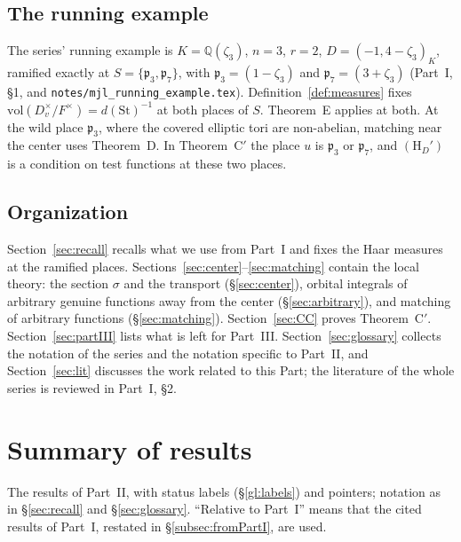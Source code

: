 \documentclass[12pt]{article}
\newcommand{\St}{\mathrm{St}}
\newcommand{\sg}{\sigma}
\theoremstyle{plain}
\theoremstyle{definition}
\begin{document}
\subsection*{The running example}
The series' running example is $K=\mathbb{Q}(\zeta_3)$, $n=3$, $r=2$, $D=(-1,4-\zeta_3)_K$, ramified exactly at $S=\{\mathfrak p_3,\mathfrak p_7\}$, with $\mathfrak p_3=(1-\zeta_3)$ and $\mathfrak p_7=(3+\zeta_3)$ (Part~I, \S1, and \texttt{notes/mjl\_running\_example.tex}). Definition~\ref{def:measures} fixes $\mathrm{vol}(D_v^\times/F^\times)=d(\St)^{-1}$ at both places of $S$. Theorem~E applies at both. At the wild place $\mathfrak p_3$, where the covered elliptic tori are non-abelian, matching near the center uses Theorem~D. In Theorem~C$'$ the place $u$ is $\mathfrak p_3$ or $\mathfrak p_7$, and $(\mathrm H_D')$ is a condition on test functions at these two places.

\subsection{Organization}
Section~\ref{sec:recall} recalls what we use from Part~I and fixes the Haar measures at the ramified places. Sections~\ref{sec:center}--\ref{sec:matching} contain the local theory: the section $\sg$ and the transport (\S\ref{sec:center}), orbital integrals of arbitrary genuine functions away from the center (\S\ref{sec:arbitrary}), and matching of arbitrary functions (\S\ref{sec:matching}). Section~\ref{sec:CC} proves Theorem~C$'$. Section~\ref{sec:partIII} lists what is left for Part~III. Section~\ref{sec:glossary} collects the notation of the series and the notation specific to Part~II, and Section~\ref{sec:lit} discusses the work related to this Part; the literature of the whole series is reviewed in Part~I, \S2.

\section*{Summary of results}\label{sec:summary}
The results of Part~II, with status labels (\S\ref{gl:labels}) and pointers; notation as in \S\ref{sec:recall} and \S\ref{sec:glossary}. ``Relative to Part~I'' means that the cited results of Part~I, restated in \S\ref{subsec:fromPartI}, are used.
\end{document}
